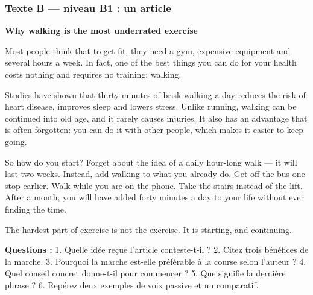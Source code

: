 \subsubsection*{Texte B --- niveau B1 : un article}
\begin{dialoguebox}[Texte B]
\begin{anglais}
\textbf{Why walking is the most underrated exercise}

Most people think that to get fit, they need a gym, expensive equipment and several hours a
week. In fact, one of the best things you can do for your health costs nothing and requires
no training: walking.

Studies have shown that thirty minutes of brisk walking a day reduces the risk of heart
disease, improves sleep and lowers stress. Unlike running, walking can be continued into old
age, and it rarely causes injuries. It also has an advantage that is often forgotten: you
can do it with other people, which makes it easier to keep going.

So how do you start? Forget about the idea of a daily hour-long walk --- it will last two
weeks. Instead, add walking to what you already do. Get off the bus one stop earlier. Walk
while you are on the phone. Take the stairs instead of the lift. After a month, you will
have added forty minutes a day to your life without ever finding the time.

The hardest part of exercise is not the exercise. It is starting, and continuing.
\end{anglais}
\end{dialoguebox}

\textbf{Questions :} 1. Quelle idée reçue l'article conteste-t-il ? 2. Citez trois bénéfices
de la marche. 3. Pourquoi la marche est-elle préférable à la course selon l'auteur ?
4. Quel conseil concret donne-t-il pour commencer ? 5. Que signifie la dernière phrase ?
6. Repérez deux exemples de voix passive et un comparatif.

